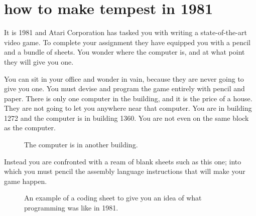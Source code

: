 \chapter{how to make tempest in 1981}
\label{sec:building}
\lstset{style=6502Style}
\lhead[tempest]{}

It is 1981 and Atari Corporation has tasked you with writing a state-of-the-art video game.
To complete your assignment they have equipped you with a pencil and a bundle of sheets. You
wonder where the computer is, and at what point they will give you one. 

You can sit in your office and wonder in vain, because they are never going to give you one.
You must devise and program the game entirely with pencil and paper. There is only one computer
in the building, and it is the price of a house. They are not going to let
you anywhere near that computer. You are in building 1272 and the computer is in building 1360.
You are not even on the same block as the computer.
\begin{figure}[H]
      \centering
    \caption{The computer is in another building.}
\end{figure}

Instead you are confronted with a ream of blank sheets such as this one; into which you must pencil
the assembly language instructions that will make your game happen.
\begin{figure}[H]
      \centering
    \caption{An example of a coding sheet to give you an idea of what programming was like in 1981.}
\end{figure}

